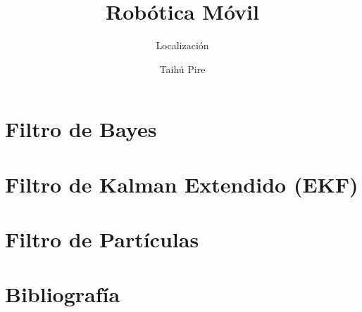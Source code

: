 \documentclass[aspectratio=169,compress]{beamer}
\subtitle{Localización}
\title{Robótica Móvil}
\author{Taihú Pire}
\institute{Laboratorio de Robótica}
\date{}
\begin{document}
	
	\frame{\titlepage}
	
	\section{Filtro de Bayes}
	
	
	\section{Filtro de Kalman Extendido (EKF)}
	

   	\section{Filtro de Partículas}
    
	
	\section{Bibliografía}
	
	
	
\end{document}
